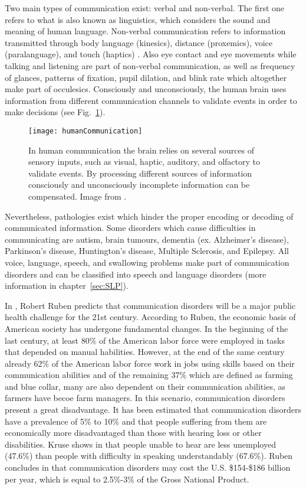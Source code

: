 Two main types of communication exist: verbal and non-verbal. The first one refers to what is also known as linguistics, which considers the sound and meaning of human language. Non-verbal communication refers to information transmitted through body language (kinesics), distance (proxemics), voice (paralanguage), and touch (haptics) \cite{Burgoon2016}. Also eye contact and eye movements while talking and listening are part of non-verbal communication, as well as frequency of glances, patterns of fixation, pupil dilation, and blink rate which altogether make part of occulesics. Consciously and unconsciously, the human brain uses information from different communication channels to validate events in order to make decisions (see Fig.~\ref{fig:humanCommunication}).

\begin{figure}
\centering
 \texttt{[image: humanCommunication]}
 \caption{In human communication the brain relies on several sources of sensory inputs,  such as visual, haptic, auditory, and  olfactory to validate events. By processing different sources of information consciously and unconsciously incomplete information can be compensated. Image from \cite{Poria2017}.}
 \label{fig:humanCommunication}
 \end{figure} 

Nevertheless, pathologies exist which hinder the proper encoding or decoding of communicated information. Some disorders which cause difficulties in communicating are autism, brain tumours, dementia (ex. Alzheimer's disease), Parkinson's disease, Huntington's disease, Multiple Sclerosis, and Epilepsy. All voice, language, speech, and swallowing problems make part of communication disorders and can be classified into speech and language disorders (more information in chapter~\ref{sec:SLP}). 

In \cite{Ruben2000}, Robert Ruben predicts that communication disorders will be a major public health challenge for the 21st century. According to Ruben, the economic basis of American society has undergone fundamental changes. In the beginning of the last century, at least 80\% of the American labor force were employed in tasks that depended on manual habilities. However, at the end of the same century already 62\% of the American labor force work in jobs using skills based on their communication abilities and of the remaining 37\% which are defined as farming and blue collar, many are also dependent on their communication abilities, as farmers have becoe farm managers. In this scenario, communication disorders present a great disadvantage. It has been estimated that communication disorders have a prevalence of 5\% to 10\% and that people suffering from them are economically more disadvantaged than those with hearing loss or other disabilities. Kruse shows in \cite{Kruse1997} that people unable to hear are less unemployed (47.6\%) than people with difficulty in speaking understandably (67.6\%). Ruben concludes in \cite{Ruben2000} that communication disorders may cost the U.S. \$154-\$186 billion per year, which is equal to 2.5\%-3\% of the Gross National Product.

